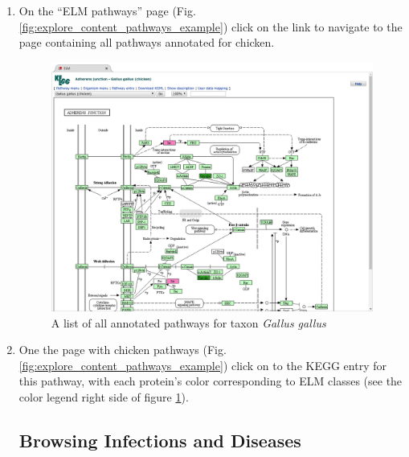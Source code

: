 \begin{enumerate}
\item On the ``ELM pathways'' page
	(Fig.  \ref{fig:explore_content_pathways_example})
	click on the link  to navigate to the page
	containing all pathways annotated for
	chicken.

\begin{figure}[h!]
	\centering
	\includegraphics[width=\textwidth]{Figures/explore_content/pathways_kegg.png} 
	\caption{
	A list of all annotated pathways for taxon \textit{Gallus gallus}
	}
	\label{fig:explore_content_pathways_kegg}
\end{figure}

\item One the page with chicken pathways
	(Fig. \ref{fig:explore_content_pathways_example})
	click on  to the KEGG entry for this pathway,
	with each protein's color corresponding to ELM classes (see the color
	legend right side of figure \ref{fig:explore_content_pathways_kegg}).

%
%
\subsection{Browsing Infections and Diseases}
\label{subsec:explore_content_infections_and_diseases}


\end{enumerate}
